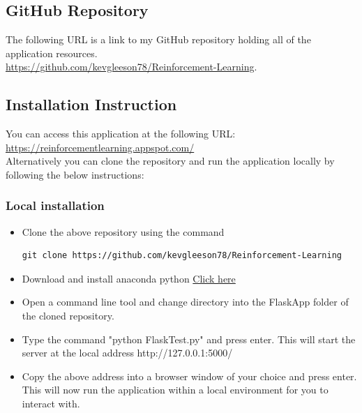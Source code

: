 \chapter{}
\section{GitHub Repository}
The following URL is a link to my GitHub repository holding all of the application resources.\\
\href{https://github.com/kevgleeson78/Reinforcement-Learning}{https://github.com/kevgleeson78/Reinforcement-Learning}.

\section{Installation Instruction}
You can access this application at the following URL:\\
\href{https://reinforcementlearning.appspot.com/}{https://reinforcementlearning.appspot.com/}\\

Alternatively you can clone the repository and run the application locally by following the below instructions:\\
\subsection{Local installation}
\begin{itemize}
	\item Clone the above repository using the command
\begin{verbatim}
git clone https://github.com/kevgleeson78/Reinforcement-Learning
\end{verbatim}
	\item Download and install anaconda python \href{https://www.anaconda.com/distribution/}{Click here}
	\item Open a command line tool and change directory into the FlaskApp folder of the cloned repository.
	\item Type the command "python FlaskTest.py" and press enter. This will start the server at the local address http://127.0.0.1:5000/
	\item Copy the above address into a browser window of your choice and press enter. This will now run the application within a local environment for you to interact with.
\end{itemize} 